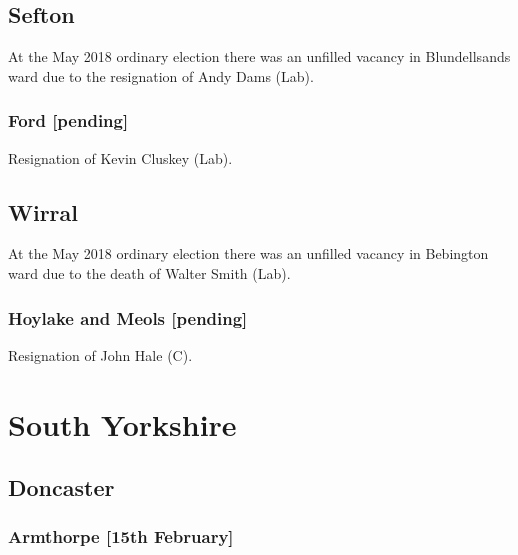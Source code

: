 \documentclass[a4paper,openany]{book}
\begin{document}
\begin{resultsiii}
\subsection*{Sefton}

At the May 2018 ordinary election there was an unfilled vacancy in Blundellsands ward due to the resignation of Andy Dams (Lab).

\subsubsection*{Ford \hspace*{\fill}\nolinebreak[1]%
\enspace\hspace*{\fill}
[pending]}


Resignation of Kevin Cluskey (Lab).

\subsection*{Wirral}

At the May 2018 ordinary election there was an unfilled vacancy in Bebington ward due to the death of Walter Smith (Lab).

\subsubsection*{Hoylake and Meols \hspace*{\fill}\nolinebreak[1]%
\enspace\hspace*{\fill}
[pending]}


Resignation of John Hale (C).

\section{South Yorkshire}

\subsection*{Doncaster}

\subsubsection*{Armthorpe \hspace*{\fill}\nolinebreak[1]%
\enspace\hspace*{\fill}
[15th February]}


\end{resultsiii}
\end{document}
